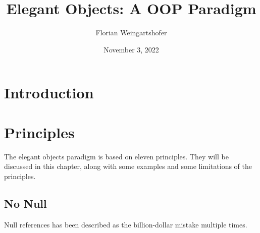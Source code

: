 \documentclass[10pt,journal]{IEEEtran}
\title{Elegant Objects: A OOP Paradigm}
\author{Florian Weingartshofer}
\date{November 3, 2022}
\begin{document}
    \maketitle



    \section{Introduction}\label{sec:introduction}


    \section{Principles}\label{sec:principles}
    The elegant objects paradigm is based on eleven principles.
    They will be discussed in this chapter, along with some examples and some limitations of the principles.

    \subsection{No Null}\label{subsec:no-null}
    Null references has been described as the billion-dollar mistake multiple times.



%    
%    
\end{document}
